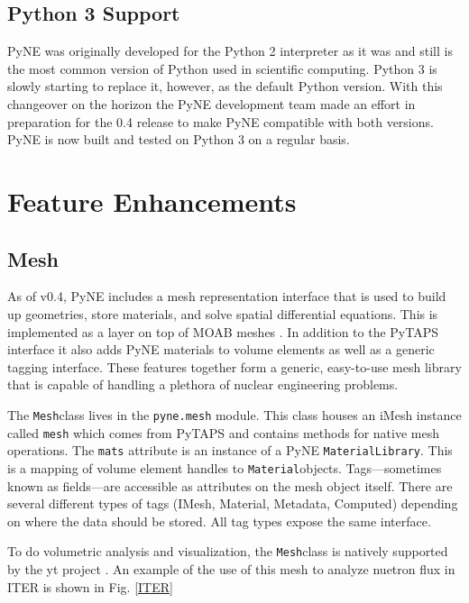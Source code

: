 \documentclass{anstrans}
\newcommand{\Mesh}{\texttt{Mesh}}
\newcommand{\Material}{\texttt{Material}}
\begin{document}
\subsection{Python 3 Support}

PyNE was originally developed for the Python 2 interpreter as it was 
and still is the most common version of Python used in scientific computing. 
Python 3 is slowly starting to replace it, however, as the default Python 
version. With this changeover on the horizon the PyNE development team 
made an effort in preparation for the 0.4 release to make PyNE compatible 
with both versions. PyNE is now built and tested on Python 3 on a regular basis.

\section{Feature Enhancements}

\subsection{Mesh}

As of v0.4, PyNE includes a mesh representation interface that is used to 
build up geometries, store materials, and solve spatial differential equations.
This is implemented as a layer on top of MOAB meshes \cite{tautges_moab:_2004}.
In addition to the PyTAPS interface \cite{pytaps} it also adds PyNE materials to 
volume elements as well as a generic tagging interface. These features together 
form a generic, easy-to-use mesh library that is capable of handling a plethora
of nuclear engineering problems.

The \Mesh class lives in the \texttt{pyne.mesh} module. This class houses an 
iMesh instance called \texttt{mesh} which comes from PyTAPS and contains 
methods for native mesh operations. The \texttt{mats} attribute is an 
instance of a PyNE \texttt{MaterialLibrary}. This is a mapping of volume 
element handles to \Material objects. Tags---sometimes known as fields---are 
accessible as attributes on the mesh object itself. There are several different types
of tags (IMesh, Material, Metadata, Computed) depending on where the data should
be stored. All tag types expose the same interface. 

To do volumetric analysis and visualization, the \Mesh class is natively supported 
by the yt project \cite{2011ApJS..192....9T}. An example of the use of this mesh
to analyze nuetron flux in ITER is shown in Fig. \ref{ITER}
\end{document}
